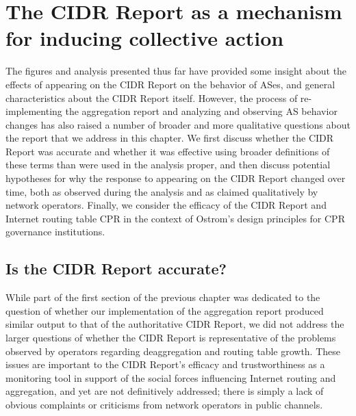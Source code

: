 \chapter{The CIDR Report as a mechanism for inducing collective action}
\label{chap:discussion}

%

The figures and analysis presented thus far have provided some insight about
the effects of appearing on the CIDR Report on the behavior of ASes, and
general characteristics about the CIDR Report itself. However, the process of
re-implementing the aggregation report and analyzing and observing AS behavior
changes has also raised a number of broader and more qualitative questions
about the report that we address in this chapter. We first discuss whether the
CIDR Report was accurate and whether it was effective using broader definitions
of these terms than were used in the analysis proper, and then discuss
potential hypotheses for why the response to appearing on the CIDR Report
changed over time, both as observed during the analysis and as claimed
qualitatively by network operators.  Finally, we consider the efficacy of the
CIDR Report and Internet routing table CPR in the context of Ostrom's design
principles for CPR governance institutions.

\section{Is the CIDR Report accurate?}

While part of the first section of the previous chapter was dedicated to the
question of whether our implementation of the aggregation report produced
similar output to that of the authoritative CIDR Report, we did not address the
larger questions of whether the CIDR Report is representative of the problems
observed by operators regarding deaggregation and routing table growth. These
issues are important to the CIDR Report's efficacy and trustworthiness as a
monitoring tool in support of the social forces influencing Internet routing
and aggregation, and yet are not definitively addressed; there is simply a lack
of obvious complaints or criticisms from network operators in public channels.

